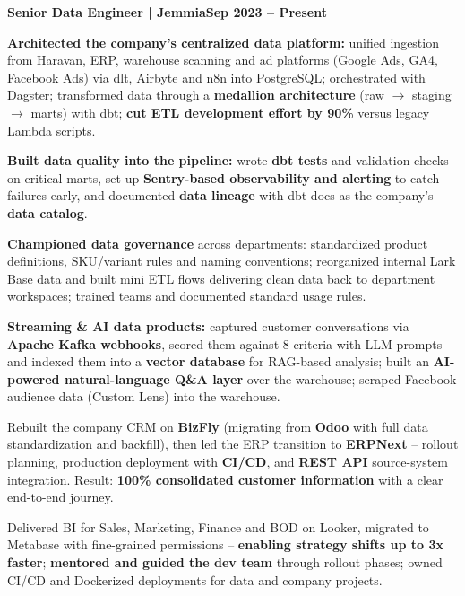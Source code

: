 \documentclass[letterpaper,10pt]{article}
\newcommand{\heading}[2]{
  \hspace{10pt}#1\hfill#2\\
}
\newcommand{\headingBf}[2]{
  \heading{\textbf{#1}}{\textbf{#2}}
}
\newenvironment{resume_list}{
  \vspace{-2pt}
  \begin{itemize}[topsep=2pt, itemsep=2pt, parsep=0pt, leftmargin=30pt, label=\textbullet]
}{
  \end{itemize}
}
\begin{document}
\headingBf{Senior Data Engineer | Jemmia}{Sep 2023 -- Present}
\vspace{3pt}
\begin{resume_list}
  \item \textbf{Architected the company's centralized data platform:} unified ingestion from Haravan, ERP, warehouse scanning and ad platforms (Google Ads, GA4, Facebook Ads) via dlt, Airbyte and n8n into PostgreSQL; orchestrated with Dagster; transformed data through a \textbf{medallion architecture} (raw $\rightarrow$ staging $\rightarrow$ marts) with dbt; \textbf{cut ETL development effort by 90\%} versus legacy Lambda scripts.
  \item \textbf{Built data quality into the pipeline:} wrote \textbf{dbt tests} and validation checks on critical marts, set up \textbf{Sentry-based observability and alerting} to catch failures early, and documented \textbf{data lineage} with dbt docs as the company's \textbf{data catalog}.
  \item \textbf{Championed data governance} across departments: standardized product definitions, SKU/variant rules and naming conventions; reorganized internal Lark Base data and built mini ETL flows delivering clean data back to department workspaces; trained teams and documented standard usage rules.
  \item \textbf{Streaming \& AI data products:} captured customer conversations via \textbf{Apache Kafka webhooks}, scored them against 8 criteria with LLM prompts and indexed them into a \textbf{vector database} for RAG-based analysis; built an \textbf{AI-powered natural-language Q\&A layer} over the warehouse; scraped Facebook audience data (Custom Lens) into the warehouse.
  \item Rebuilt the company CRM on \textbf{BizFly} (migrating from \textbf{Odoo} with full data standardization and backfill), then led the ERP transition to \textbf{ERPNext} -- rollout planning, production deployment with \textbf{CI/CD}, and \textbf{REST API} source-system integration. Result: \textbf{100\% consolidated customer information} with a clear end-to-end journey.
  \item Delivered BI for Sales, Marketing, Finance and BOD on Looker, migrated to Metabase with fine-grained permissions -- \textbf{enabling strategy shifts up to 3x faster}; \textbf{mentored and guided the dev team} through rollout phases; owned CI/CD and Dockerized deployments for data and company projects.
\end{resume_list}
\end{document}
